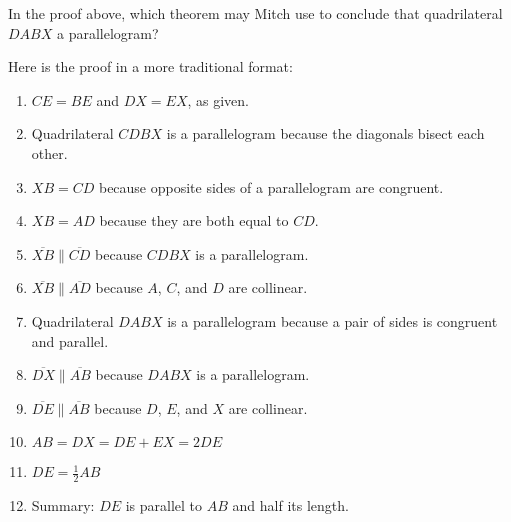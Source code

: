 \documentclass[nooutcomes]{ximera}
\begin{document}
\begin{problem}
\begin{problem}
In the proof above, which theorem may Mitch use to conclude that quadrilateral $DABX$ a parallelogram?  
\begin{multipleChoice}
\end{multipleChoice}

\begin{feedback}[correct]
Here is the proof in a more traditional format: 
\begin{enumerate}
\item $CE = BE$ and $DX=EX$, as given.
\item Quadrilateral $CDBX$ is a parallelogram because the diagonals bisect each other. 
\item $XB=CD$ because opposite sides of a parallelogram are congruent.
\item $XB=AD$ because they are both equal to $CD$. 
\item $\overline{XB} \parallel \overline{CD}$ because $CDBX$ is a parallelogram. 
\item $\overline{XB} \parallel \overline{AD}$ because $A$, $C$, and $D$ are collinear. 
\item Quadrilateral $DABX$ is a parallelogram because a pair of sides is congruent and parallel.  
\item $\overline{DX} \parallel \overline{AB}$ because $DABX$ is a parallelogram. 
\item $\overline{DE} \parallel \overline{AB}$ because $D$, $E$, and $X$ are collinear.  
\item $AB = DX = DE + EX = 2DE$
\item $DE = \frac{1}{2}AB$
\item Summary:  $DE$ is parallel to $AB$ and half its length.  
\end{enumerate}
\end{feedback}
\end{problem}

\end{problem}
\end{document}
